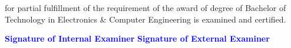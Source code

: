 \documentclass[12pt]{report}	%
\begin{document}
\begin{titlepage}
  \begin{center}
		{\small for partial fulfillment of the requirement of the award of degree of Bachelor of Technology in Electronics & Computer  Engineering is examined and certified.}\\
  \end{center}
		 
\vspace*{0.2in}

\vspace*{1.5cm}


\textcolor{blue}{\textbf{Signature of Internal Examiner}} \hspace*{1.0in} \textcolor{blue}{\textbf{Signature of External Examiner}}\\

\end{titlepage}
\end{document}
